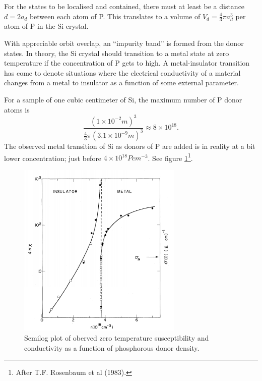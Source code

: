 \documentclass[11pt]{amsart}
\begin{document}
For the states to be localised and contained, there must at least be a distance $d=2a_d$ between each atom of P. This translates to a volume of $V_d = \frac{4}{3}\pi a_d^3$ per atom of P in the Si crystal. 

With appreciable orbit overlap, an ``impurity band'' is formed from the donor states. In theory, the Si crystal should transition to a metal state at zero temperature if the concentration of P gets to high. A metal-insulator transition has come to denote situations where the electrical conductivity of a material changes from a metal to insulator as a function of some external parameter.

For a sample of one cubic centimeter of Si, the maximum number of P donor atoms is
\begin{equation*}
\frac{(1\times10^{-2}m)^3}{\frac{4}{3}\pi(3.1\times10^{-9}m)^3} \approx 8 \times 10^{18}.
\end{equation*}
The observed metal transition of Si as donors of P are added is in reality at a bit lower concentration; just before $4\times10^{18} Pcm^{-3}$. See figure \ref{fig:rosenbaum1}\footnote{After T.F. Rosenbaum et al (1983).}.

\begin{figure}
\centering
	\includegraphics[width = 0.7\textwidth]{rosenbaum1.png}
	\caption{Semilog plot of oberved zero temperature susceptibility and conductivity as a function of phosphorous donor density.}
	\label{fig:rosenbaum1}
\end{figure}
\end{document}
